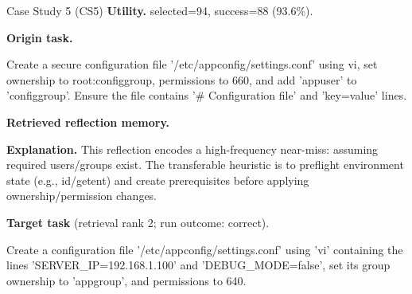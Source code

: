 \documentclass{article}
\theoremstyle{plain}
\theoremstyle{definition}
\theoremstyle{remark}
\begin{document}
\begin{CaseBox}{Case Study 5 (CS5)}
\textbf{Utility.} selected=94, success=88 (93.6\%).
\par\medskip
\textbf{Origin task.}
\begin{CodeBox}
Create a secure configuration file '/etc/appconfig/settings.conf' using vi, set ownership to root:configgroup, permissions to 660, and add 'appuser' to 'configgroup'. Ensure the file contains '# Configuration file' and 'key=value' lines.
\end{CodeBox}
\medskip
\textbf{Retrieved reflection memory.}
\par\medskip
\textbf{Explanation.} This reflection encodes a high-frequency near-miss: assuming required users/groups exist. The transferable heuristic is to preflight environment state (e.g., id/getent) and create prerequisites before applying ownership/permission changes.
\par\medskip
\textbf{Target task} (retrieval rank 2; run outcome: correct).
\begin{CodeBox}
Create a configuration file '/etc/appconfig/settings.conf' using 'vi' containing the lines 'SERVER_IP=192.168.1.100' and 'DEBUG_MODE=false', set its group ownership to 'appgroup', and permissions to 640.
\end{CodeBox}
\end{CaseBox}
\medskip
\end{document}
